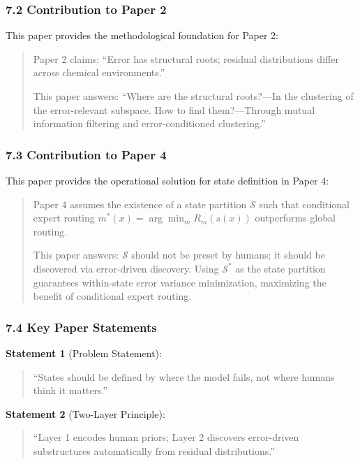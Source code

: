 \documentclass[
  12pt,
]{article}
\begin{document}
\subsubsection{7.2 Contribution to Paper 2}\label{contribution-to-paper-2}

This paper provides the methodological foundation for Paper 2:

\begin{quote}
Paper 2 claims: ``Error has structural roots; residual distributions differ across chemical environments.''

This paper answers: ``Where are the structural roots?---In the clustering of the error-relevant subspace. How to find them?---Through mutual information filtering and error-conditioned clustering.''
\end{quote}

\subsubsection{7.3 Contribution to Paper 4}\label{contribution-to-paper-4}

This paper provides the operational solution for state definition in Paper 4:

\begin{quote}
Paper 4 assumes the existence of a state partition $\mathcal{S}$ such that conditional expert routing $m^*(x) = \arg\min_m R_m(s(x))$ outperforms global routing.

This paper answers: $\mathcal{S}$ should not be preset by humans; it should be discovered via error-driven discovery. Using $\mathcal{S}^*$ as the state partition guarantees within-state error variance minimization, maximizing the benefit of conditional expert routing.
\end{quote}

\subsubsection{7.4 Key Paper Statements}\label{key-paper-statements}

\textbf{Statement 1} (Problem Statement):
\begin{quote}
``States should be defined by where the model fails, not where humans think it matters.''
\end{quote}

\textbf{Statement 2} (Two-Layer Principle):
\begin{quote}
``Layer 1 encodes human priors; Layer 2 discovers error-driven substructures automatically from residual distributions.''
\end{quote}
\end{document}
